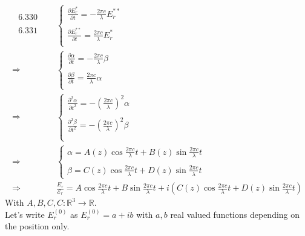 \begin{align}
 \begin{array}{l}
\text{ 6.330}\\\\
\text{  6.331}\\
\end{array}
\quad &\left\{ \begin{array}{l}
\frac{\partial E^{*}_r}{\partial t} = -\frac{2\pi c}{\lambda} E^{**}_r\\\\
\frac{\partial E^{**}_r}{\partial t} = \frac{2\pi c}{\lambda}  E^{*}_r\\
\end{array}\right.\\
\Rightarrow &\left\{\begin{array}{l}
\frac{\partial \alpha}{\partial t} = -\frac{2\pi c}{\lambda} \beta\\\\
\frac{\partial \beta}{\partial t} = \frac{2\pi c}{\lambda}  \alpha\\
\end{array}\right.\\
\Rightarrow &\left\{\begin{array}{l}
\frac{\partial^2 \alpha}{\partial t^2} = -\left(\frac{2\pi c}{\lambda}\right) ^2 \alpha\\\\
\frac{\partial^2 \beta}{\partial t^2} = -\left(\frac{2\pi c}{\lambda}\right) ^2 \beta\\\\
\end{array}\right.\\
\Rightarrow &\left\{\begin{array}{l}
\alpha = A\left(z\right)\cos \frac{2\pi c}{\lambda}  t + B\left(z\right)\sin \frac{2\pi c}{\lambda}  t \\\\
\beta = C\left(z\right)\cos \frac{2\pi c}{\lambda}  t + D\left(z\right)\sin \frac{2\pi c}{\lambda}  t   
\end{array}\right.\\
\Rightarrow \quad & \frac{E^{}_r}{\mathcal{E}_r}=A\cos \frac{2\pi c}{\lambda} t + B\sin \frac{2\pi c}{\lambda} t+i\left(C\left(z\right)\cos \frac{2\pi c}{\lambda}  t + D\left(z\right)\sin \frac{2\pi c}{\lambda}  t \right)
\end{align}
With $A,B,C,C:\mathbb{R}^3\rightarrow \mathbb{R}$.\\
Let's write $E^{(0)}_r$ as $E^{(0)}_r = a+ib$ with $a, b$ real valued functions depending on the position only.
